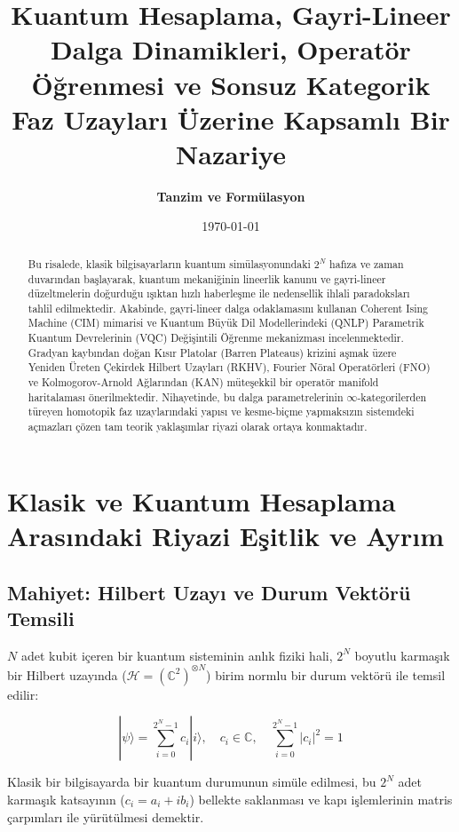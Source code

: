 \documentclass[11pt, a4paper]{article}
\title{\textbf{Kuantum Hesaplama, Gayri-Lineer Dalga Dinamikleri, Operatör Öğrenmesi ve Sonsuz Kategorik Faz Uzayları Üzerine Kapsamlı Bir Nazariye}}
\author{\textbf{Tanzim ve Formülasyon}}
\date{\today}
\begin{document}
\maketitle

\begin{abstract}
Bu risalede, klasik bilgisayarların kuantum simülasyonundaki $2^N$ hafıza ve zaman duvarından başlayarak, kuantum mekaniğinin lineerlik kanunu ve gayri-lineer düzeltmelerin doğurduğu ışıktan hızlı haberleşme ile nedensellik ihlali paradoksları tahlil edilmektedir. Akabinde, gayri-lineer dalga odaklamasını kullanan Coherent Ising Machine (CIM) mimarisi ve Kuantum Büyük Dil Modellerindeki (QNLP) Parametrik Kuantum Devrelerinin (VQC) Değişintili Öğrenme mekanizması incelenmektedir. Gradyan kaybından doğan Kısır Platolar (Barren Plateaus) krizini aşmak üzere Yeniden Üreten Çekirdek Hilbert Uzayları (RKHV), Fourier Nöral Operatörleri (FNO) ve Kolmogorov-Arnold Ağlarından (KAN) müteşekkil bir operatör manifold haritalaması önerilmektedir. Nihayetinde, bu dalga parametrelerinin $\infty$-kategorilerden türeyen homotopik faz uzaylarındaki yapısı ve kesme-biçme yapmaksızın sistemdeki açmazları çözen tam teorik yaklaşımlar riyazi olarak ortaya konmaktadır.
\end{abstract}

\tableofcontents
\newpage

\section{Klasik ve Kuantum Hesaplama Arasındaki Riyazi Eşitlik ve Ayrım}

\subsection{Mahiyet: Hilbert Uzayı ve Durum Vektörü Temsili}
$N$ adet kubit içeren bir kuantum sisteminin anlık fiziki hali, $2^N$ boyutlu karmaşık bir Hilbert uzayında ($\mathcal{H} = (\mathbb{C}^2)^{\otimes N}$) birim normlu bir durum vektörü ile temsil edilir:

\begin{equation}
|\psi\rangle = \sum_{i=0}^{2^N-1} c_i |i\rangle, \quad c_i \in \mathbb{C}, \quad \sum_{i=0}^{2^N-1} |c_i|^2 = 1
\end{equation}

Klasik bir bilgisayarda bir kuantum durumunun simüle edilmesi, bu $2^N$ adet karmaşık katsayının ($c_i = a_i + i b_i$) bellekte saklanması ve kapı işlemlerinin matris çarpımları ile yürütülmesi demektir.
\end{document}

